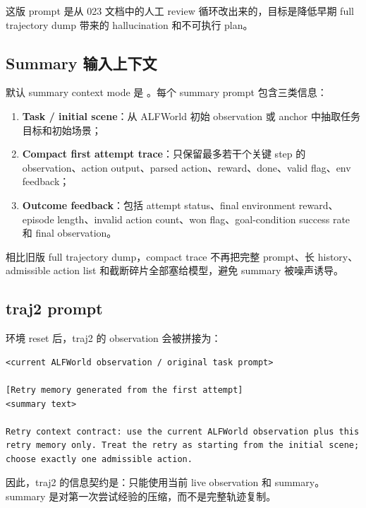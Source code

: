 \documentclass[10pt]{ctexart}
\begin{document}
这版 prompt 是从 023 文档中的人工 review 循环改出来的，目标是降低早期 full trajectory dump 带来的 hallucination 和不可执行 plan。

\subsection{Summary 输入上下文}
默认 summary context mode 是 。每个 summary prompt 包含三类信息：
\begin{enumerate}
  \item \textbf{Task / initial scene}：从 ALFWorld 初始 observation 或 anchor 中抽取任务目标和初始场景；
  \item \textbf{Compact first attempt trace}：只保留最多若干个关键 step 的 observation、action output、parsed action、reward、done、valid flag、env feedback；
  \item \textbf{Outcome feedback}：包括 attempt status、final environment reward、episode length、invalid action count、won flag、goal-condition success rate 和 final observation。
\end{enumerate}

相比旧版 full trajectory dump，compact trace 不再把完整 prompt、长 history、admissible action list 和截断碎片全部塞给模型，避免 summary 被噪声诱导。

\subsection{traj2 prompt}
环境 reset 后，traj2 的 observation 会被拼接为：
\begin{lstlisting}
<current ALFWorld observation / original task prompt>

[Retry memory generated from the first attempt]
<summary text>

Retry context contract: use the current ALFWorld observation plus this retry memory only. Treat the retry as starting from the initial scene; choose exactly one admissible action.
\end{lstlisting}

因此，traj2 的信息契约是：只能使用当前 live observation 和 summary。summary 是对第一次尝试经验的压缩，而不是完整轨迹复制。
\end{document}
